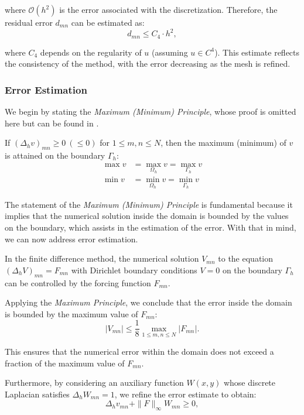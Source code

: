 \documentclass[aps,amsmath,amssymb,floatfix]{revtex4}
\begin{document}
where $\mathcal{O}(h^2)$ is the error associated with the discretization. Therefore, the residual error $d_{mn}$ can be estimated as:
\begin{equation*}
	d_{mn} \leq C_4 \cdot h^2,
\end{equation*}

where $C_4$ depends on the regularity of $u$ (assuming $u \in C^4$). This estimate reflects the consistency of the method, with the error decreasing as the mesh is refined.

\subsubsection{Error Estimation}
We begin by stating the \textit{Maximum (Minimum) Principle}, whose proof is omitted here but can be found in \cite{Chen2014}.

If $(\Delta_h v)_{mn} \geq 0 \ (\leq 0)$ for $1 \leq m, n \leq N$, then the maximum (minimum) of $v$ is attained on the boundary $\Gamma_h$:
\begin{align*}
	\max v & = \max_{\Omega_h} v = \max_{\Gamma_h} v \\
	\min v & = \min_{\Omega_h} v = \min_{\Gamma_h} v 
\end{align*}

The statement of the \textit{Maximum (Minimum) Principle} is fundamental because it implies that the numerical solution inside the domain is bounded by the values on the boundary, which assists in the estimation of the error. With that in mind, we can now address error estimation.

In the finite difference method, the numerical solution $V_{mn}$ to the equation $(\Delta_h V)_{mn} = F_{mn}$ with Dirichlet boundary conditions $V = 0$ on the boundary $\Gamma_h$ can be controlled by the forcing function $F_{mn}$.

Applying the \textit{Maximum Principle}, we conclude that the error inside the domain is bounded by the maximum value of $F_{mn}$:
\begin{equation*}
	|V_{mn}| \leq \frac{1}{8} \max_{1 \leq m,n \leq N} |F_{mn}|.
\end{equation*}

This ensures that the numerical error within the domain does not exceed a fraction of the maximum value of $F_{mn}$.

Furthermore, by considering an auxiliary function $W(x, y)$ whose discrete Laplacian satisfies $\Delta_h W_{mn} = 1$, we refine the error estimate to obtain:
\begin{equation*}
	\Delta_h v_{mn} + \|F\|_\infty W_{mn} \geq 0,
\end{equation*}
\end{document}
